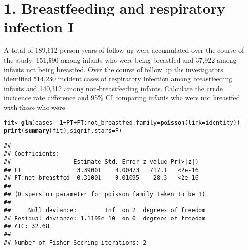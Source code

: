 \documentclass[10pt]{beamer}\usepackage[]{graphicx}\usepackage[]{color}
\makeatletter
\newcommand{\hlnum}[1]{\textcolor[rgb]{0.686,0.059,0.569}{#1}}%
\newcommand{\hlopt}[1]{\textcolor[rgb]{0,0,0}{#1}}%
\newcommand{\hlstd}[1]{\textcolor[rgb]{0.345,0.345,0.345}{#1}}%
\newcommand{\hlkwb}[1]{\textcolor[rgb]{0.69,0.353,0.396}{#1}}%
\newcommand{\hlkwc}[1]{\textcolor[rgb]{0.333,0.667,0.333}{#1}}%
\newcommand{\hlkwd}[1]{\textcolor[rgb]{0.737,0.353,0.396}{\textbf{#1}}}%
\newenvironment{kframe}{%
 \def\at@end@of@kframe{}%
 \ifinner\ifhmode%
  \def\at@end@of@kframe{\end{minipage}}%
  \begin{minipage}{\columnwidth}%
 \fi\fi%
 \def\FrameCommand##1{\hskip\@totalleftmargin \hskip-\fboxsep
 \colorbox{shadecolor}{##1}\hskip-\fboxsep
     \hskip-\linewidth \hskip-\@totalleftmargin \hskip\columnwidth}%
 \MakeFramed {\advance\hsize-\width
   \@totalleftmargin\z@ \linewidth\hsize
   \@setminipage}}%
 {\par\unskip\endMakeFramed%
 \at@end@of@kframe}
\newenvironment{knitrout}{}{} %
\makeatother
\begin{document}
\section{1. Breastfeeding and respiratory infection I}
\begin{frame}
\vspace*{-.91in}
\tiny
A total of 189,612 person-years of follow up were accumulated over the course of the study: 151,690
among infants who were being breastfed and 37,922 among infants not being breastfed. Over the
course of follow up the investigators identified 514,230 incident cases of respiratory infection among
breastfeeding infants and 140,312 among non-breastfeeding infants. Calculate the crude incidence rate difference and 95\% CI comparing infants who were not breastfed with those who were.
\begin{knitrout}\tiny
{}\color{fgcolor}\begin{kframe}
\begin{alltt}
\hlstd{fit} \hlkwb{<-} \hlkwd{glm}\hlstd{(cases} \hlopt{~ -}\hlnum{1} \hlopt{+} \hlstd{PT} \hlopt{+} \hlstd{PT}\hlopt{:}\hlstd{not_breastfed,} \hlkwc{family} \hlstd{=} \hlkwd{poisson}\hlstd{(}\hlkwc{link} \hlstd{= identity))}
\hlkwd{print}\hlstd{(}\hlkwd{summary}\hlstd{(fit),} \hlkwc{signif.stars} \hlstd{= F)}
\end{alltt}
\begin{verbatim}
## 
## Coefficients:
##                  Estimate Std. Error z value Pr(>|z|)
## PT                3.39001    0.00473   717.1   <2e-16
## PT:not_breastfed  0.31001    0.01095    28.3   <2e-16
## 
## (Dispersion parameter for poisson family taken to be 1)
## 
##     Null deviance:        Inf  on 2  degrees of freedom
## Residual deviance: 1.1195e-10  on 0  degrees of freedom
## AIC: 32.68
## 
## Number of Fisher Scoring iterations: 2
\end{verbatim}
\end{kframe}
\end{knitrout}

\end{frame}
\end{document}
